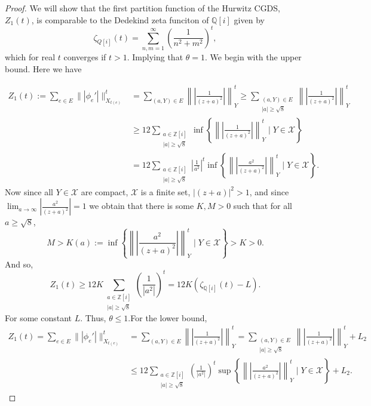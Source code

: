 \documentclass[11pt]{amsart}
\theoremstyle{plain}
\theoremstyle{definition}
\renewcommand\~{\tilde}%
\newcommand{\cX}{\ensuremath{\mathcal{X}}}
\newcommand{\QQ}{\ensuremath{\mathbb Q}}%
\newcommand{\ZZ}{\ensuremath{\mathbb Z}} %
\numberwithin{equation}{section}
\begin{document}
\begin{proof}
    We will show that the first partition function of the Hurwitz CGDS, $Z_1(t)$, is comparable to the Dedekind zeta funciton of $\mathbb{Q}[i]$ given by $$\zeta_{Q[i]}(t)=\sum_{n,m=1}^{\infty}\left(\frac{1}{n^2+m^2}\right)^t,$$
    which for real $t$ converges if $t>1$. Implying that $\theta =1$. We begin with the upper bound. Here we have 

    \begin{align*}
        Z_1(t) := \sum_{e\in E}\||\phi_e'|\|^t_{X_{t(e)}} 
        &= \sum_{(a,Y)\in E}\left\|\left\vert\frac{1}{(z+a)^2}\right\vert\right\|_Y^t \geq \sum_{\substack{(a,Y)\in E\\ |a|\geq \sqrt{8}}} \left\|\left\vert\frac{1}{(z+a)^2}\right\vert\right\|_Y^t\\
        &\geq 12 \sum_{\substack{a\in \ZZ[i]\\ |a|\geq \sqrt{8}}}\inf\left\{\left\|\left\vert\frac{1}{(z+a)^2}\right\vert\right\|_Y^t\;\Bigg|\; Y\in \cX \right\}\\
        &= 12 \sum_{\substack{a\in \ZZ[i]\\ |a|\geq \sqrt{8}}} \left\vert\frac{1}{a^2}\right\vert^t\inf\left\{\left\|\left\vert\frac{a^2}{(z+a)^2}\right\vert\right\|_Y^t\;\Bigg|\; Y\in \cX \right\}.
    \end{align*}
    Now since all $Y \in \cX$ are compact, $\cX$ is a finite set, $|(z+a)|^2>1$, and since $\lim_{a\to\infty}\left\vert\frac{a^2}{(z+a)^2}\right\vert = 1$ we obtain that there is some $K,M>0$ such that for all $a\geq \sqrt 8$,
    $$
        M> K(a) := \inf\left\{\left\|\left\vert\frac{a^2}{(z+a)^2}\right\vert\right\|_Y^t\;\Bigg|\; Y\in \cX \right\} > K >0.
    $$
    And so,
    $$
        Z_1(t) \geq 12K\sum_{\substack{a\in \ZZ[i]\\ |a|\geq \sqrt{8}}}\left(\frac{1}{|a^2|}\right)^t = 12K(\zeta_{\QQ[i]}(t)-L).
    $$
    For some constant $L$. Thus, $\theta\leq 1$.\newline For the lower bound, 
    \begin{align*}
        Z_1(t) = \sum_{e\in E}\||\phi_e'|\|^t_{X_{t(e)}} 
        &= \sum_{(a,Y)\in E}\left\|\left\vert\frac{1}{(z+a)^2}\right\vert\right\|_Y^t = \sum_{\substack{(a,Y)\in E\\ |a|\geq \sqrt{8}}} \left\|\left\vert\frac{1}{(z+a)^2}\right\vert\right\|_Y^t+L_2 \\
        &\leq 12\sum_{\substack{a\in \ZZ[i]\\ |a|\geq \sqrt{8}}}\left(\frac{1}{|a^2|}\right)^t \sup\left\{\left\|\left\vert\frac{a^2}{(z+a)^2}\right\vert\right\|_Y^t\;\Bigg|\; Y\in \cX \right\}+L_2.

\end{align*}
\end{proof}
\end{document}
